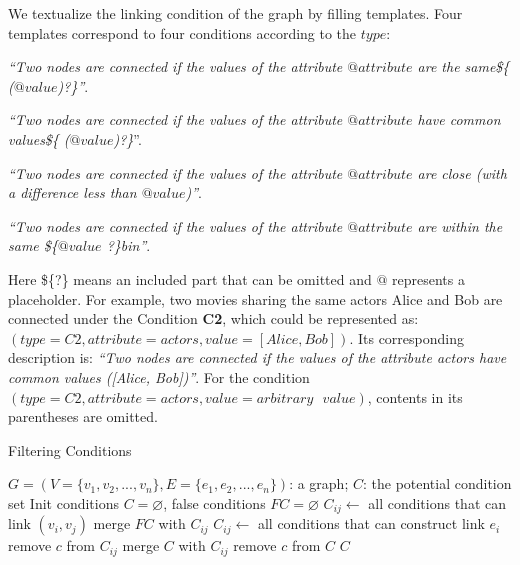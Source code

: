 We textualize the linking condition of the graph by filling templates. 
Four templates correspond to four conditions according to the $type$:
\begin{compactenum}[\textbf{T}1]
    \item \textit{``Two nodes are connected if the values of the attribute $@attribute$ are the same\$\{ ($@value$)?\}''}.
    \item \textit{``Two nodes are connected if the values of the attribute $@attribute$ have common values\$\{ ($@value$)?\}}''.
    \item \textit{``Two nodes are connected if the values of the attribute $@attribute$ are close (with a difference less than $@value$)''}.
    \item \textit{``Two nodes are connected if the values of the attribute $@attribute$ are within the same \$\{$@value$ ?\}bin''}.
\end{compactenum}
Here \$\{?\} means an included part that can be omitted and $@$ represents a placeholder.
For example, two movies sharing the same actors Alice and Bob are connected under the Condition \textbf{C2}, which could be represented as: $(type=C2, attribute=actors, value=[Alice, Bob])$. 
Its corresponding description is: \textit{``Two nodes are connected if the values of the attribute actors have common values ([Alice, Bob])''}. 
For the condition $(type=C2, attribute=actors, value=arbitrary\text{ }value)$, contents in its parentheses are omitted.

\begin{algorithm}[!t]
    \renewcommand\arraystretch{1.2}
    \caption{ Filtering Conditions }
    \label{alg:conditions}
    \begin{algorithmic}[1]
        \Require
            $G=(V=\{v_1, v_2, ..., v_n\}, E=\{e_1, e_2, ..., e_n\})$: a graph;
        \Ensure
            $C$: the potential condition set
        \State Init conditions $C=\varnothing$, false conditions $FC=\varnothing$
                \State $C_{ij} \gets$ all conditions that can link $(v_i, v_j)$
                \State merge $FC$ with $C_{ij}$
            \EndIf
        \EndFor
            \State $C_{ij} \gets$ all conditions that can construct link $e_i$
                    \State remove $c$ from $C_{ij}$
                \EndIf
            \EndFor
            \State merge $C$ with $C_{ij}$
        \EndFor
                \State remove $c$ from $C$
            \EndIf
        \EndFor
        \State \Return $C$
    \end{algorithmic}
\end{algorithm}


